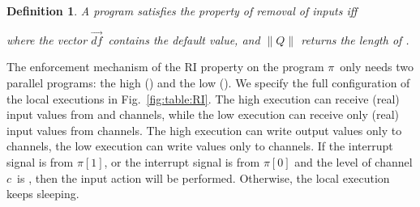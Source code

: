 \documentclass[10pt,a4paper,oneside]{article}
\newtheorem{definition}{Definition}[section]
\def\chnl{\ensuremath{c}}
\def\defvec{\ensuremath{\vec{df}}}
\def\Prog{\ensuremath{\pi}}
\def\Progl#1{\ensuremath{\Prog[#1]}}
\def\length#1{\ensuremath{\parallel#1\parallel}}
\begin{document}
\begin{definition}\label{def:RI}
A program  satisfies the property of \emph{removal of inputs} iff

where the vector \defvec\ contains the default value, and \length{Q} returns the length of .
\end{definition}



The enforcement mechanism of the RI property on the program \Prog\ only needs two parallel programs: the high () and the low (). We specify the full configuration of the local executions in Fig.~\ref{fig:table:RI}. The high execution can receive (real) input values from  and  channels, while the low execution can receive only (real) input values from  channels. The high execution can write output values only to  channels, the low execution can write values only to  channels. If the interrupt signal is from \Progl{1}, or the interrupt signal is from \Progl{0} and the level of channel \chnl\ is , then the input action will be performed. Otherwise, the local execution keeps sleeping.
\end{document}
